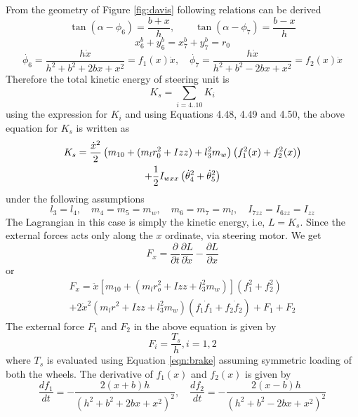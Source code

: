 From the geometry of Figure \ref{fig:davis} following relations can be derived 
\begin{equation}
\label{eqn:thetaTox}
\tan(\alpha-\phi_6)=\frac{b+x}{h}, \quad \quad \tan(\alpha-\phi_7)=\frac{b-x}{h}
\end{equation}
\begin{equation}
\label{ro}
x^b_6+y^b_6=x^b_7+y^b_7=r_0
\end{equation}
\begin{equation}
\dot{\phi_6}=\dfrac{h\dot x}{h^2+b^2+2bx+x^2}=f_1(x)\dot x,\quad \dot{\phi_7}=\dfrac{h\dot x}{h^2+b^2-2bx+x^2}=f_2(x)\dot x
\end{equation}
 Therefore the total kinetic energy of steering unit is 
\[K_s=\sum_{i=4..10}K_i\]
using the expression for $K_i$  and using Equations 4.48, 4.49 and 4.50, the above equation for $K_s$  is written as 
\begin{multline}
	K_s=\frac{\dot x^2}{2} \left( m_{10}+(m_l r^2_0+I{zz})+l^2_3m_w \right) \left(f^2_1(x)+f^2_2(x) \right)\\ + \frac{1}{2} I_{wxx}\left(\dot\theta^2_4  +\dot\theta^2_5\right)
\end{multline}
under the following assumptions \[l_3=l_4, \quad m_4=m_5=m_w, \quad m_6=m_7=m_l, \quad I_{7zz}=I_{6zz}=I_{zz}\]
The Lagrangian in this case is simply the kinetic energy, i.e,  $L=K_s$. Since the external forces acts only along the $x$ ordinate, via steering motor. We get
\[F_x= \dfrac{\partial}{\partial t}\dfrac{\partial L}{\partial \dot x} - \dfrac{\partial L}{\partial x}\]
or 
\begin{multline}
\label{eqn:SteerDyn}
F_x=\ddot{x}\left[ m_{10}+\left(m_lr_o^2+I{zz}+l^2_3m_w \right) \right] \left( f_1^2+f_2^2 \right)\\
+2\dot x^2 \left(m_lr^2+I{zz}+l_3^2 m_w \right) \left( f_1 \dot f_1 +f_2 \dot f_2\right)+F_1+F_2
\end{multline}
The external force $F_1$ and $F_2$ in the above equation is given by
\[F_i=\dfrac{T_s}{h},i={1,2} \]
where $T_s$ is evaluated using Equation \ref{eqn:brake} assuming symmetric loading of both the wheels. The derivative of $f_1(x)$ and  $f_2(x)$ is given by 
\[ \dfrac{df_1}{dt}=-\dfrac{2(x+b)h}{(h^2+b^2+2bx+x^2)^2}, \quad \dfrac{df_2}{dt}=-\dfrac{2(x-b)h}{(h^2+b^2-2bx+x^2)^2}\]



